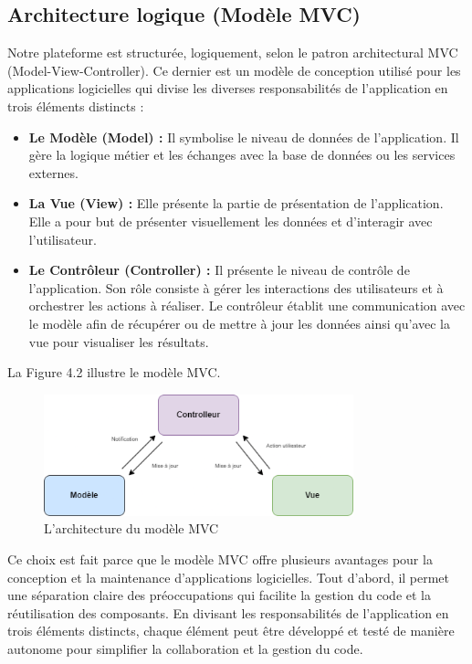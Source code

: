 \subsection{Architecture logique (Modèle MVC)}
Notre plateforme est structurée, logiquement, selon le patron architectural MVC (Model-View-Controller). Ce dernier est un modèle de conception utilisé pour les applications logicielles qui divise les diverses responsabilités de l'application en trois éléments distincts :
\begin{itemize}[itemsep=1pt, parsep=1pt]
    \item \textbf{Le Modèle (Model) : }Il symbolise le niveau de données de l'application. Il gère la logique métier et les échanges avec la base de données ou les services externes.
    \item \textbf{La Vue (View) : }Elle présente la partie de présentation de l’application. Elle a pour but de présenter visuellement les données et d’interagir avec l’utilisateur.
    \item  \textbf{Le Contrôleur (Controller) : }Il présente le niveau de contrôle de l'application. Son rôle consiste à gérer les interactions des utilisateurs et à orchestrer les actions à réaliser. Le contrôleur établit une communication avec le modèle afin de récupérer ou de mettre à jour les données ainsi qu'avec la vue pour visualiser les résultats.
\end{itemize}
La Figure 4.2 illustre le modèle MVC.
\begin{figure}[H]
    \centering
    \includegraphics[width=0.8\textwidth,height=0.4\textwidth]{images/chp4/fig2.png}
    \caption{L’architecture du modèle MVC}
    \label{fig:architecture-MVC}    
\end{figure}
\noindent Ce choix est fait parce que le modèle MVC offre plusieurs avantages pour la conception et la maintenance d'applications logicielles. Tout d'abord, il permet une séparation claire des préoccupations qui facilite la gestion du code et la réutilisation des composants. En divisant les responsabilités de l'application en trois éléments distincts, chaque élément peut être développé et testé de manière autonome pour simplifier la collaboration et la gestion du code.


